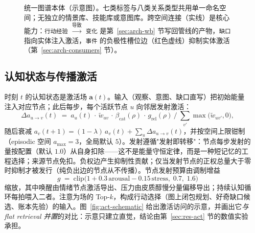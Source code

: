 \documentclass[10pt,a4paper]{ctexart}
\begin{document}
\begin{figure}[t]
{}%
\caption{统一图谱本体（示意图）。七类标签与八类关系类型共用单一命名空间；无独立的情景库、技能库或意图库。跨空间连接（实线）是核心能力：\texttt{行动经验} $\xrightarrow{\texttt{导致}}$ \texttt{变化} 是第~\ref{sec:arch-wb} 节写回管线的产物，\texttt{缺口} 指向实体注入激活，\texttt{事件} 的负极性槽位边（红色虚线）抑制实体激活（第~\ref{sec:arch-consumers} 节）。}
\label{fig:ontology}
\end{figure}

\subsection{认知状态与传播激活}
\label{sec:arch-act}
时刻 $t$ 的认知状态是激活场 $\mathbf{a}(t)$。输入（观察、意图、缺口直写）把初始能量注入对应节点；此后每步，每个活跃节点 $u$ 向邻居发射激活：
\begin{equation}
\Delta a_{u\rightarrow v}(t) \;=\; a_u(t)\,\cdot\, \tilde w_{uv}\,\cdot\, \beta_{\mathrm{cat}}(\rho)\,\cdot\, g_{\mathrm{rel}}(\rho)\,\Big/\; \textstyle\sum_{v'} \max\big(\tilde w_{uv'},0\big),
\label{eq:spread}
\end{equation}
随后衰减 $a_v(t{+}1) = (1-\lambda)\,a_v(t) + \sum_u \Delta a_{u\rightarrow v}(t)$，并按空间上限钳制（episodic 空间 $a_{\max}{=}3$，全局默认 $5$）。发射遵循"发射即转移"：节点每步发射的量按配置（默认 $1.0$）从自身扣除——这不是能量守恒定律，而是一种短记忆的工程选择；来源节点免扣。负权边产生抑制性贡献；仅当发射节点的正权总量大于零时抑制才被发行（纯负出边的节点从不传播）。节点发射预算由调制增益
\begin{equation}
g \;=\; \mathrm{clip}\big(1 + 0.3\,\mathrm{arousal} - 0.15\,\mathrm{stress},\; 0.7,\; 1.6\big)
\label{eq:mod}
\end{equation}
缩放，其中唤醒由情绪节点激活导出、压力由皮质醇慢分量偏移导出；持续认知循环每拍喂入二者。注意为场的 Top-$k$，构成行动选择（图上闭包规划、好奇缺口候选、账本先验）的输入。图~\ref{fig:act-schematic} 给出激活访问的示意，并画出它\emph{与 flat retrieval 并置}的对比：示意只建立直觉，结论由第~\ref{sec:res-act} 节的数值实验承担。
\end{document}
